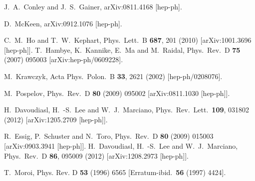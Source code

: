 \begin{thebibliography}{99}
  J.~A.~Conley and J.~S.~Gainer,
  arXiv:0811.4168 [hep-ph].

  D.~McKeen,
  arXiv:0912.1076 [hep-ph].

  C.~M.~Ho and T.~W.~Kephart,
  Phys.\ Lett.\ B {\bf 687}, 201 (2010)
  [arXiv:1001.3696 [hep-ph]].
  T.~Hambye, K.~Kannike, E.~Ma and M.~Raidal,
  Phys.\ Rev.\  D {\bf 75} (2007) 095003
  [arXiv:hep-ph/0609228].



  M.~Krawczyk,
  Acta Phys.\ Polon.\ B {\bf 33}, 2621 (2002)
  [hep-ph/0208076].

  M.~Pospelov,
  Phys.\ Rev.\  D {\bf 80} (2009) 095002
  [arXiv:0811.1030 [hep-ph]].


  H.~Davoudiasl, H.~-S.~Lee and W.~J.~Marciano,
  Phys.\ Rev.\ Lett.\  {\bf 109}, 031802 (2012)
  [arXiv:1205.2709 [hep-ph]].

  R.~Essig, P.~Schuster and N.~Toro,
  Phys.\ Rev.\  D {\bf 80} (2009) 015003
  [arXiv:0903.3941 [hep-ph]].
  H.~Davoudiasl, H.~-S.~Lee and W.~J.~Marciano,
  Phys.\ Rev.\ D {\bf 86}, 095009 (2012)
  [arXiv:1208.2973 [hep-ph]].


T.~Moroi,  
                     {Phys. Rev. D} {\bf  53} (1996) 6565
                     [Erratum-ibid.\ {\bf 56} (1997) 4424].



\end{thebibliography}
